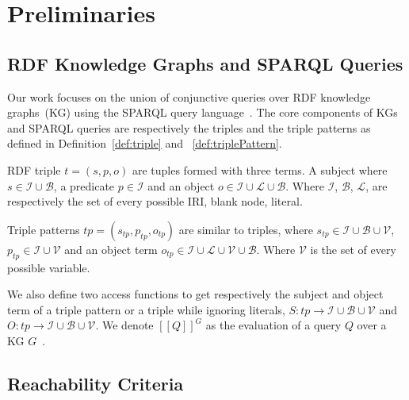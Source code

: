 \section{Preliminaries}\label{sec:preliminaries}

\subsection{RDF Knowledge Graphs and SPARQL Queries}

Our work focuses on the union of conjunctive queries over RDF knowledge graphs~(KG) using the SPARQL query language~\cite{w3SPARQLQuery}.
The core components of KGs and SPARQL queries are respectively the triples and the triple patterns as defined in Definition~\ref{def:triple} and ~\ref{def:triplePattern}.

\begin{definition}[Triple]\label{def:triple}
    RDF triple $t = (s,p,o)$ are tuples formed with three terms. A subject where $s \in\mathcal{I} \cup \mathcal{B}$, a predicate $p \in \mathcal{I}$ and an object $o \in \mathcal{I} \cup \mathcal{L} \cup \mathcal{B}$.
    Where $\mathcal{I}$, $\mathcal{B}$, $\mathcal{L}$,  are respectively the set of every possible IRI, blank node, literal.
\end{definition}

\begin{definition}\label{def:triplePattern}
    Triple patterns $tp = (s_{tp}, p_{tp}, o_{tp})$ are similar to triples, where $s_{tp} \in \mathcal{I} \cup \mathcal{B} \cup \mathcal{V}$,
    $p_{tp} \in \mathcal{I} \cup \mathcal{V}$ and an object term  $o_{tp} \in \mathcal{I} \cup \mathcal{L} \cup \mathcal{V} \cup \mathcal{B}$.
    Where $\mathcal{V}$ is the set of every possible variable.
\end{definition}

We also define two access functions to get respectively the subject and object term of a triple pattern or a triple while ignoring literals,
$ S: tp \rightarrow \mathcal{I} \cup \mathcal{B} \cup \mathcal{V}$ and $O: tp \rightarrow \mathcal{I} \cup \mathcal{B} \cup \mathcal{V}$.
We denote $[\![ Q ]\!]^{G}$ as the evaluation of a query $Q$ over a KG $G$~\cite{Angles2008}.

\subsection{Reachability Criteria}

